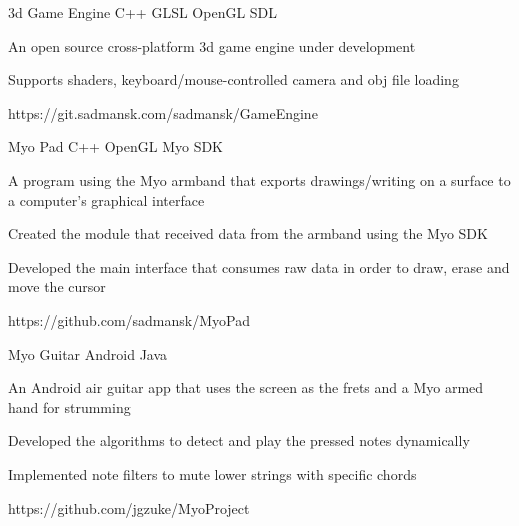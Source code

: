 



\begin{cvprojects}

\cvproject
{3d Game Engine}
{C++ \textbullet{} GLSL \textbullet{} OpenGL \textbullet{} SDL}
{
An open source cross-platform 3d game engine under development
\begin{cvitems}
\item[]
\item {Supports shaders, keyboard/mouse-controlled camera and obj file loading}
\end{cvitems}
}
{https://git.sadmansk.com/sadmansk/GameEngine}


\cvproject
{Myo Pad}
{C++ \textbullet{} OpenGL \textbullet{} Myo SDK}
{
A program using the Myo armband that exports drawings/writing on a surface to a computer's graphical interface 
\begin{cvitems}
\item[]
\item {Created the module that received data from the armband using the Myo SDK}
\item {Developed the main interface that consumes raw data in order to draw, erase and move the cursor}
\end{cvitems}
}
{https://github.com/sadmansk/MyoPad}


\cvproject
{Myo Guitar}
{Android \textbullet{} Java}
{
An Android air guitar app that uses the screen as the frets and a Myo armed hand for strumming
\begin{cvitems}
\item[]
\item {Developed the algorithms to detect and play the pressed notes dynamically}
\item {Implemented note filters to mute lower strings with specific chords}
\end{cvitems}
}
{https://github.com/jgzuke/MyoProject}


\end{cvprojects}
